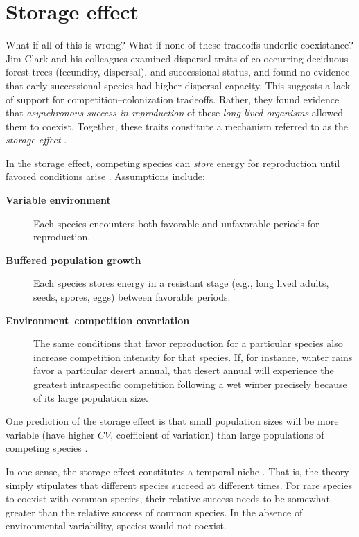 \section{Storage effect}
What if all of this is wrong? What if none of these tradeoffs underlie coexistance? Jim Clark and his colleagues \cite{Clark2004} examined dispersal traits of co-occurring deciduous forest trees (fecundity, dispersal), and  successional status, and found no evidence that early successional species had higher dispersal capacity. This suggests a lack of support for competition--colonization tradeoffs. Rather, they found evidence that \emph{asynchronous success in reproduction} of these \emph{long-lived organisms} allowed them to coexist. Together, these traits constitute a mechanism referred to as the \emph{storage effect} \cite{Chesson2000a,Warner1985}.

In the storage effect, competing species can \emph{store} energy for reproduction until favored conditions arise \cite{Chesson2000a,Warner1985}. Assumptions include:
\begin{description}
\item[\textbf{Variable environment}] Each species encounters both favorable and unfavorable periods for reproduction.
\item[\textbf{Buffered population growth}] Each species stores energy in a resistant stage (e.g., long lived adults, seeds, spores, eggs) between favorable periods.
\item[\textbf{Environment--competition covariation}] The same conditions that favor reproduction for a particular species also increase competition intensity for that species. If, for instance, winter rains favor a particular desert annual, that desert annual will experience the greatest intraspecific competition following a wet winter precisely because of its large population size. 
\end{description}
One prediction of the storage effect is that small population sizes will be more variable (have higher $CV$, coefficient of variation) than large populations of competing species \cite{Kelly2002}. 

In one sense, the storage effect constitutes a temporal niche \cite{Chesson2000a}. That is, the theory simply stipulates that different species succeed at different times. For rare species to coexist with common species, their relative success needs to be somewhat greater than the relative success of common species. In the absence of environmental variability, species would not coexist.

